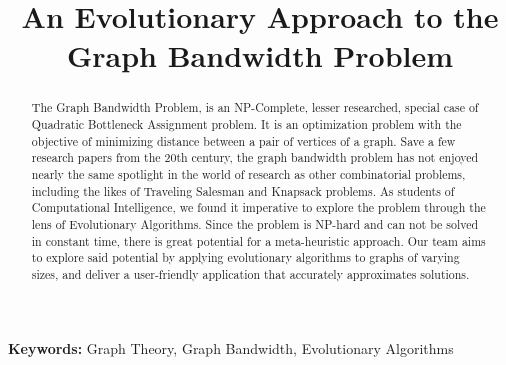 \documentclass[conference,compsoc]{IEEEtran}
\begin{document}
\title{An Evolutionary Approach to the Graph Bandwidth Problem}
\author{
\and
{}
\and
{}
}

\maketitle

\begin{abstract}
  The Graph Bandwidth Problem, is an NP-Complete, lesser researched, special case of 
  Quadratic Bottleneck Assignment problem. It is an optimization problem with the objective of 
  minimizing distance between a pair of vertices of a graph. Save a few research papers from the 
  20th century, the graph bandwidth problem has not enjoyed nearly the same spotlight in the world 
  of research as other combinatorial problems, including the likes of Traveling Salesman and Knapsack problems. 
  As students of Computational Intelligence, we found it imperative to explore the problem through the lens of 
  Evolutionary Algorithms. Since the problem is NP-hard and can not be solved in constant time, there is great potential 
  for a meta-heuristic approach. Our team aims to explore said potential by applying evolutionary 
  algorithms to graphs of varying sizes, and deliver a user-friendly application that accurately approximates solutions.
\end{abstract}
\textbf{Keywords:} Graph Theory, Graph Bandwidth, Evolutionary Algorithms

\IEEEpeerreviewmaketitle
\end{document}
